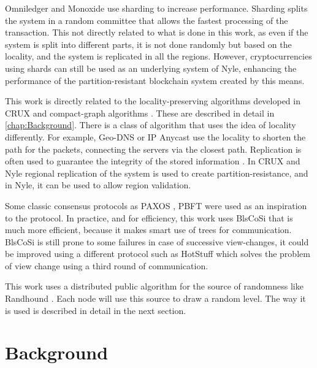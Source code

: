 \documentclass[a4paper,11pt,oneside]{report}
\begin{document}
Omniledger \cite{Kokoris-Kogias2017} and Monoxide \cite{Wang2019} use
sharding to increase performance. Sharding splits the system in a random
committee that allows the fastest processing of the transaction. This not
directly related to what is done in this work, as even if the system is split
into different parts, it is not done randomly but based on the locality, and the
system is replicated in all the regions. However, cryptocurrencies using shards
can still be used as an underlying system of Nyle, enhancing the performance of
the partition-resistant blockchain system created by this means.

This work is directly related to the locality-preserving algorithms developed
in CRUX \cite{Basescu2014} and compact-graph algorithms \cite{Thorup2005}.
These are described in detail in \autoref{chap:Background}. There is a class of
algorithm that uses the idea of locality differently. For example,
Geo-DNS \cite{Katz-bassett2006} or IP Anycast \cite{Abley2006} use the locality to shorten the path for the packets, connecting the servers via the
closest path. Replication is often used to guarantee the integrity of the stored
information \cite{Mokadem2015}. In CRUX \cite{Basescu2014} and Nyle
regional replication of the system is used to create partition-resistance, and
in Nyle, it can be used to allow region validation.

Some classic consensus protocols as PAXOS \cite{Lamport2000}, PBFT
\cite{Castro1999} were used as an inspiration to the
protocol. In practice, and for efficiency, this work uses BlsCoSi
\cite{Boneh2018} that is much more efficient, because it makes smart use of trees for communication.
BlsCoSi \cite{Boneh2018} is still prone to some failures in case of successive
view-changes, it could be improved using a different protocol such as HotStuff
\cite{Yin2018} which solves the problem of view change using a third round of
communication. 

This work uses a distributed public algorithm for the source of randomness
like Randhound \cite{Syta2016}. Each node will use this source to draw a random
level. The way it is used is described in detail in the next section. 


\chapter{Background} \label{chap:Background} %
\end{document}
